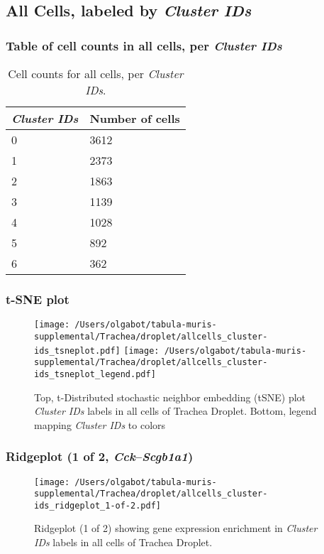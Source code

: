 \clearpage

\subsection{All Cells, labeled by \emph{Cluster IDs}}
\subsubsection{Table of cell counts in all cells, per \emph{Cluster IDs}}\begin{table}[h]
\centering
\label{my-label}
\begin{tabular}{@{}ll@{}}
\toprule

\emph{Cluster IDs}& Number of cells \\ \midrule
0 & 3612 \\

1 & 2373 \\

2 & 1863 \\

3 & 1139 \\

4 & 1028 \\

5 & 892 \\

6 & 362 \\
\bottomrule
\end{tabular}
\caption{Cell counts for all cells, per \emph{Cluster IDs}.}
\end{table}

\clearpage
\subsubsection{t-SNE plot}
\begin{figure}[h]
\centering
\texttt{[image: /Users/olgabot/tabula-muris-supplemental/Trachea/droplet/allcells\_cluster-ids\_tsneplot.pdf]}
\texttt{[image: /Users/olgabot/tabula-muris-supplemental/Trachea/droplet/allcells\_cluster-ids\_tsneplot\_legend.pdf]}
\caption{Top, t-Distributed stochastic neighbor embedding (tSNE) plot  \emph{Cluster IDs} labels in all cells of Trachea Droplet. Bottom, legend mapping \emph{Cluster IDs} to colors}
\end{figure}


\clearpage

\subsubsection{Ridgeplot (1 of 2, \emph{Cck}--\emph{Scgb1a1})}
\begin{figure}[h]
\centering
\texttt{[image: /Users/olgabot/tabula-muris-supplemental/Trachea/droplet/allcells\_cluster-ids\_ridgeplot\_1-of-2.pdf]}

\caption{ Ridgeplot (1 of 2)  showing gene expression enrichment in \emph{Cluster IDs} labels in all cells of Trachea Droplet. }
\end{figure}


